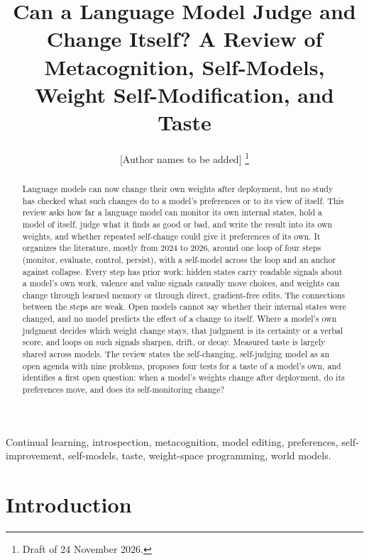 \documentclass[journal]{IEEEtran}
\begin{document}
\title{Can a Language Model Judge and Change Itself? A Review of Metacognition, Self-Models, Weight Self-Modification, and Taste}
\author{[Author names to be added]%
\thanks{Draft of 24 November 2026.}}
\maketitle

\begin{abstract}
Language models can now change their own weights after deployment, but no study has checked what such changes do to a model's preferences or to its view of itself. This review asks how far a language model can monitor its own internal states, hold a model of itself, judge what it finds as good or bad, and write the result into its own weights, and whether repeated self-change could give it preferences of its own. It organizes the literature, mostly from 2024 to 2026, around one loop of four steps (monitor, evaluate, control, persist), with a self-model across the loop and an anchor against collapse. Every step has prior work: hidden states carry readable signals about a model's own work, valence and value signals causally move choices, and weights can change through learned memory or through direct, gradient-free edits. The connections between the steps are weak. Open models cannot say whether their internal states were changed, and no model predicts the effect of a change to itself. Where a model's own judgment decides which weight change stays, that judgment is its certainty or a verbal score, and loops on such signals sharpen, drift, or decay. Measured taste is largely shared across models. The review states the self-changing, self-judging model as an open agenda with nine problems, proposes four tests for a taste of a model's own, and identifies a first open question: when a model's weights change after deployment, do its preferences move, and does its self-monitoring change?
\end{abstract}

\begin{IEEEkeywords}
Continual learning, introspection, metacognition, model editing, preferences, self-improvement, self-models, taste, weight-space programming, world models.
\end{IEEEkeywords}

\section{Introduction}\label{sec:1}
\end{document}
